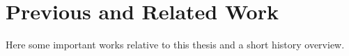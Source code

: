 \chapter{Previous and Related Work}
Here some important works relative to this thesis and a short history overview.


